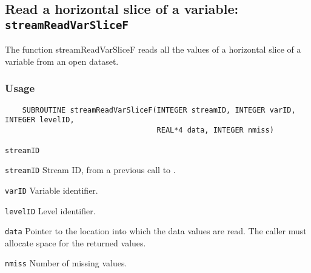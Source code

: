 \subsection{Read a horizontal slice of a variable: \texttt{streamReadVarSliceF}}
\label{streamReadVarSliceF}

The function streamReadVarSliceF reads all the values of a horizontal slice of a variable
from an open dataset.
\subsubsection*{Usage}

\begin{verbatim}
    SUBROUTINE streamReadVarSliceF(INTEGER streamID, INTEGER varID, INTEGER levelID, 
                                   REAL*4 data, INTEGER nmiss)
\end{verbatim}

\hspace*{4mm}\begin{minipage}[]{15cm}
\begin{deflist}{\texttt{streamID}\ }
\item[\texttt{streamID}]
Stream ID, from a previous call to {}.
\item[\texttt{varID}]
Variable identifier.
\item[\texttt{levelID}]
Level identifier.
\item[\texttt{data}]
Pointer to the location into which the data values are read.
                     The caller must allocate space for the returned values.
\item[\texttt{nmiss}]
Number of missing values.

\end{deflist}
\end{minipage}
